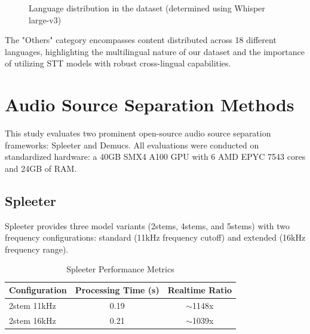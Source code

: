 \documentclass[10pt]{article}
\begin{document}
\begin{figure}[H]
\centering
{}
\caption{Language distribution in the dataset (determined using Whisper large-v3)}
\label{fig:language-dist}
\end{figure}

The "Others" category encompasses content distributed across 18 different languages, highlighting the multilingual nature of our dataset and the importance of utilizing STT models with robust cross-lingual capabilities.

\section{Audio Source Separation Methods}
This study evaluates two prominent open-source audio source separation frameworks: Spleeter and Demucs. All evaluations were conducted on standardized hardware: a 40GB SMX4 A100 GPU with 6 AMD EPYC 7543 cores and 24GB of RAM.

\subsection{Spleeter}
Spleeter provides three model variants (2stems, 4stems, and 5stems) with two frequency configurations: standard (11kHz frequency cutoff) and extended (16kHz frequency range).

\begin{table}[ht]
\centering
\caption{Spleeter Performance Metrics}
\label{tab:spleeter-metrics}
\begin{tabular}{lcc}
\toprule
\textbf{Configuration} & \textbf{Processing Time (s)} & \textbf{Realtime Ratio} \\
\midrule
2stem 11kHz & 0.19 & $\sim$1148x \\
2stem 16kHz & 0.21 & $\sim$1039x \\
\bottomrule
\end{tabular}
\end{table}
\end{document}
